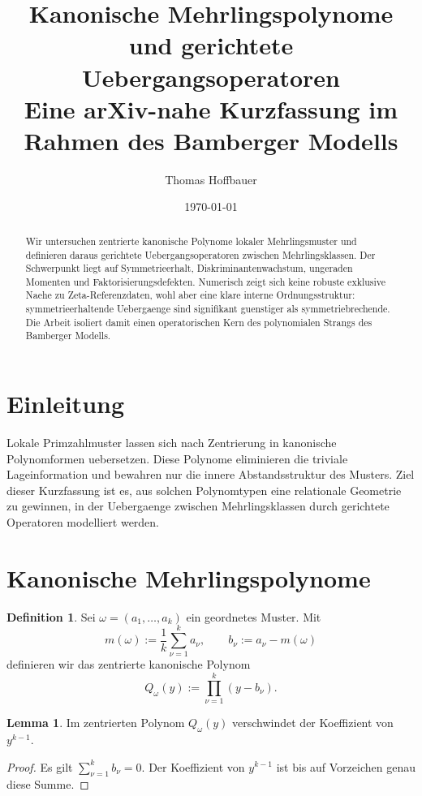 \documentclass[11pt,a4paper]{article}
\title{Kanonische Mehrlingspolynome und gerichtete Uebergangsoperatoren\\
\large Eine arXiv-nahe Kurzfassung im Rahmen des Bamberger Modells}
\author{Thomas Hoffbauer}
\date{\today}
\theoremstyle{definition}
\newtheorem{lemma}[satz]{Lemma}
\newtheorem{definition}[satz]{Definition}
\begin{document}
\maketitle

\begin{abstract}
Wir untersuchen zentrierte kanonische Polynome lokaler Mehrlingsmuster und definieren daraus gerichtete Uebergangsoperatoren zwischen Mehrlingsklassen. Der Schwerpunkt liegt auf Symmetrieerhalt, Diskriminantenwachstum, ungeraden Momenten und Faktorisierungsdefekten. Numerisch zeigt sich keine robuste exklusive Naehe zu Zeta-Referenzdaten, wohl aber eine klare interne Ordnungsstruktur: symmetrieerhaltende Uebergaenge sind signifikant guenstiger als symmetriebrechende. Die Arbeit isoliert damit einen operatorischen Kern des polynomialen Strangs des Bamberger Modells.
\end{abstract}

\section{Einleitung}

Lokale Primzahlmuster lassen sich nach Zentrierung in kanonische Polynomformen uebersetzen. Diese Polynome eliminieren die triviale Lageinformation und bewahren nur die innere Abstandsstruktur des Musters. Ziel dieser Kurzfassung ist es, aus solchen Polynomtypen eine relationale Geometrie zu gewinnen, in der Uebergaenge zwischen Mehrlingsklassen durch gerichtete Operatoren modelliert werden.

\section{Kanonische Mehrlingspolynome}

\begin{definition}
Sei \(\omega=(a_1,\dots,a_k)\) ein geordnetes Muster. Mit
\[
m(\omega):=\frac{1}{k}\sum_{\nu=1}^k a_\nu,\qquad b_\nu:=a_\nu-m(\omega)
\]
definieren wir das zentrierte kanonische Polynom
\[
Q_\omega(y):=\prod_{\nu=1}^k (y-b_\nu).
\]
\end{definition}

\begin{lemma}
Im zentrierten Polynom \(Q_\omega(y)\) verschwindet der Koeffizient von \(y^{k-1}\).
\end{lemma}

\begin{proof}
Es gilt \(\sum_{\nu=1}^k b_\nu=0\). Der Koeffizient von \(y^{k-1}\) ist bis auf Vorzeichen genau diese Summe.
\end{proof}
\end{document}
